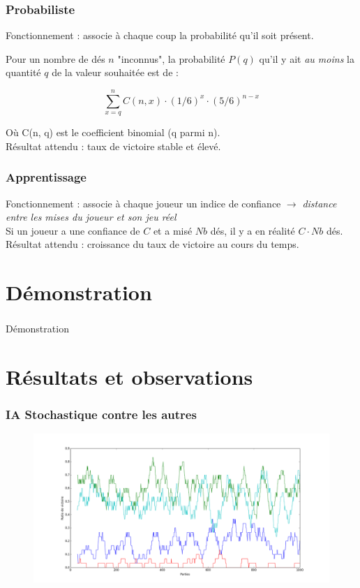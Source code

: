 \documentclass{beamer}
\begin{document}
\begin{frame}
  \frametitle{Probabiliste}

  Fonctionnement : associe à chaque coup la probabilité qu'il soit présent.

  Pour un nombre de dés $n$ "inconnus", la probabilité $P(q)$ qu'il y ait
  \emph{au moins} la quantité $q$ de la valeur souhaitée est de :

  $$
  \sum\limits_{x=q}^n C(n, x) \cdot (1/6)^x \cdot (5/6)^{n-x}
  $$

  Où C(n, q) est le coefficient binomial (q parmi n).
  \\[1cm]

  Résultat attendu : taux de victoire stable et élevé.
\end{frame}

\begin{frame}
  \frametitle{Apprentissage}

  Fonctionnement : associe à chaque joueur un indice de confiance $\to$
  \textit{distance entre les mises du joueur et son jeu réel}
  \\[1cm]
  Si un joueur a une confiance de $C$ et a misé $Nb$ dés, il y a en réalité $C
  \cdot Nb$ dés.
  \\[1cm]
  Résultat attendu : croissance du taux de victoire au cours du temps.
\end{frame}

\section{Démonstration}
\begin{frame}
  \frametitle{}

  \begin{center}
    Démonstration
  \end{center}
\end{frame}

\section{Résultats et observations}

\begin{frame}
  \frametitle{IA Stochastique contre les autres}

  \begin{figure}
    \includegraphics[scale=0.265]{plot/ivre}
  \end{figure}
\end{frame}
\end{document}
